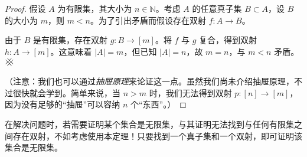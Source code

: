 \begin{proof}
    假设 $A$ 为有限集，其大小为 $n \in \mathbb{N}$。考虑 $A$ 的任意真子集 $B \subset A$，设 $B$ 的大小为 $m$，则 $m < n$。为了引出矛盾而假设存在双射 $f : A \to B$。

    由于 $B$ 是有限集，存在双射 $g : B \to [m]$。将 $f$ 与 $g$ 复合，得到双射 $h : A \to [m]$。这意味着 $|A| = m$，但已知 $|A| = n$，故 $m = n$，与 $m < n$ 矛盾。$\hashx$

    （注意：我们也可以通过\emph{抽屉原理}来论证这一点。虽然我们尚未介绍抽屉原理，不过很快就会学到。简单来说，当 $n > m$ 时，我们无法得到双射 $p:[n] \to [m]$，因为没有足够的``抽屉''可以容纳 $n$ 个``东西''。）
\end{proof}

在解决问题时，若需要证明某个集合是无限集，与其证明无法找到与任何有限集之间存在双射，不如考虑使用本定理！只要找到一个真子集和一个双射，即可证明该集合是无限集。

\clearpage
